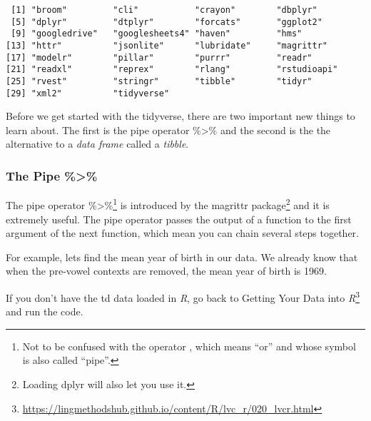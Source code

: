 \documentclass[
  12pt,
  letterpaper]{article}
\renewcommand\texttt[1]{{\ttfamily\color{BrickRed}#1}}
\DeclareRobustCommand{\href}[2]{#2\footnote{\url{#1}}}
\begin{document}
\begin{verbatim}
 [1] "broom"         "cli"           "crayon"        "dbplyr"       
 [5] "dplyr"         "dtplyr"        "forcats"       "ggplot2"      
 [9] "googledrive"   "googlesheets4" "haven"         "hms"          
[13] "httr"          "jsonlite"      "lubridate"     "magrittr"     
[17] "modelr"        "pillar"        "purrr"         "readr"        
[21] "readxl"        "reprex"        "rlang"         "rstudioapi"   
[25] "rvest"         "stringr"       "tibble"        "tidyr"        
[29] "xml2"          "tidyverse"    
\end{verbatim}

Before we get started with the \texttt{tidyverse}, there are two
important new things to learn about. The first is the pipe operator
\texttt{\%\textgreater{}\%} and the second is the the alternative to a
\emph{data frame} called a \emph{tibble}.

\hypertarget{the-pipe}{%
\subsubsection{The Pipe \%\textgreater\%}\label{the-pipe}}

The pipe operator \texttt{\%\textgreater{}\%}\footnote{Not to be
  confused with the operator \texttt{\textbar{}}, which means ``or'' and
  whose symbol is also called ``pipe''.} is introduced by the
\texttt{magrittr} package\footnote{Loading \texttt{dplyr} will also let
  you use it.} and it is extremely useful. The pipe operator passes the
output of a function to the first argument of the next function, which
mean you can chain several steps together.

For example, lets find the mean year of birth in our data. We already
know that when the pre-vowel contexts are removed, the mean year of
birth is 1969.

\begin{tcolorbox}[enhanced jigsaw, breakable, opacityback=0, colframe=quarto-callout-tip-color-frame, opacitybacktitle=0.6, toptitle=1mm, toprule=.15mm, title=\textcolor{quarto-callout-tip-color}{\faLightbulb}\hspace{0.5em}{Get the data first}, coltitle=black, colback=white, colbacktitle=quarto-callout-tip-color!10!white, left=2mm, leftrule=.75mm, titlerule=0mm, arc=.35mm, bottomtitle=1mm, rightrule=.15mm, bottomrule=.15mm]

If you don't have the \texttt{td} data loaded in \emph{R}, go back to
\href{https://lingmethodshub.github.io/content/R/lvc_r/020_lvcr.html}{Getting
Your Data into \emph{R}} and run the code.

\end{tcolorbox}
\end{document}
